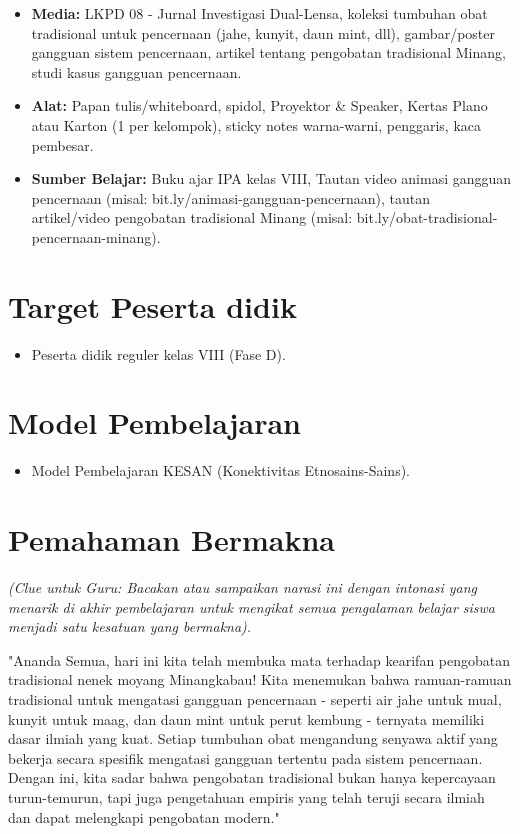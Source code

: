 \documentclass[a4paper,12pt]{article}
\begin{document}
\begin{itemize}
\item \textbf{Media:} LKPD 08 - Jurnal Investigasi Dual-Lensa, koleksi tumbuhan obat tradisional untuk pencernaan (jahe, kunyit, daun mint, dll), gambar/poster gangguan sistem pencernaan, artikel tentang pengobatan tradisional Minang, studi kasus gangguan pencernaan.
\item \textbf{Alat:} Papan tulis/whiteboard, spidol, Proyektor \& Speaker, Kertas Plano atau Karton (1 per kelompok), sticky notes warna-warni, penggaris, kaca pembesar.
\item \textbf{Sumber Belajar:} Buku ajar IPA kelas VIII, Tautan video animasi gangguan pencernaan (misal: bit.ly/animasi-gangguan-pencernaan), tautan artikel/video pengobatan tradisional Minang (misal: bit.ly/obat-tradisional-pencernaan-minang).
\end{itemize}

\section{Target Peserta didik}

\begin{itemize}
\item Peserta didik reguler kelas VIII (Fase D).
\end{itemize}

\section{Model Pembelajaran}

\begin{itemize}
\item Model Pembelajaran KESAN (Konektivitas Etnosains-Sains).
\end{itemize}

\section{Pemahaman Bermakna}
\textit{(Clue untuk Guru: Bacakan atau sampaikan narasi ini dengan intonasi yang menarik di akhir pembelajaran untuk mengikat semua pengalaman belajar siswa menjadi satu kesatuan yang bermakna).}

\begin{tcolorbox}[sectionbox]
"Ananda Semua, hari ini kita telah membuka mata terhadap kearifan pengobatan tradisional nenek moyang Minangkabau! Kita menemukan bahwa ramuan-ramuan tradisional untuk mengatasi gangguan pencernaan - seperti air jahe untuk mual, kunyit untuk maag, dan daun mint untuk perut kembung - ternyata memiliki dasar ilmiah yang kuat. Setiap tumbuhan obat mengandung senyawa aktif yang bekerja secara spesifik mengatasi gangguan tertentu pada sistem pencernaan. Dengan ini, kita sadar bahwa pengobatan tradisional bukan hanya kepercayaan turun-temurun, tapi juga pengetahuan empiris yang telah teruji secara ilmiah dan dapat melengkapi pengobatan modern."
\end{tcolorbox}
\end{document}
